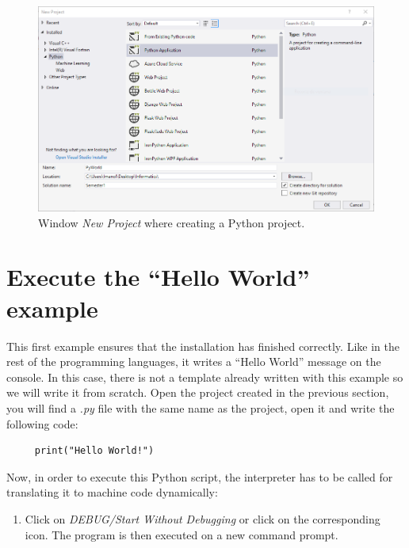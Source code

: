 \begin{figure}[h]
    \centering
    \includegraphics[width= \textwidth]{Figures/PP0V2.png}
    \caption{Window \textit{New Project} where creating a Python project.}
    \label{fig:PP0}
\end{figure}



    \section{Execute the ``Hello World'' example}

This first example ensures that the installation has finished correctly. Like in the rest of the programming languages, it writes a ``Hello World'' message on the console. In this case, there is not a template already written with this example so we will write it from scratch. Open the project created in the previous section, you will find a \textit{.py} file with the same name as the project, open it and write the following code: %

\vspace{0.5cm} 
\begin{lstlisting}
     print("Hello World!")
\end{lstlisting}

Now, in order to execute this Python script, the interpreter has to be called for translating it to machine code dynamically:

\begin{enumerate}
	\item Click on \textit{DEBUG/Start Without Debugging} or click on the corresponding icon. The program is then executed on a new command prompt.
\end{enumerate}

